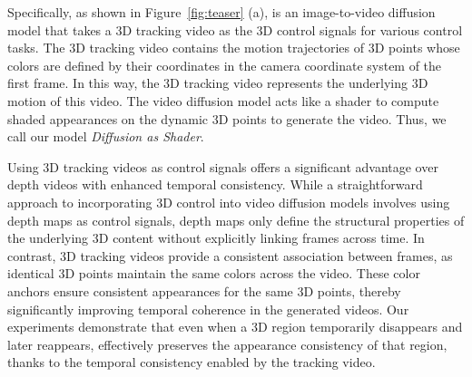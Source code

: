 Specifically, as shown in Figure~\ref{fig:teaser} (a), \methodname is an image-to-video diffusion model that takes a 3D tracking video as the 3D control signals for various control tasks. 
The 3D tracking video contains the motion trajectories of 3D points whose colors are defined by their coordinates in the camera coordinate system of the first frame. In this way, the 3D tracking video represents the underlying 3D motion of this video. The video diffusion model acts like a shader to compute shaded appearances on the dynamic 3D points to generate the video. Thus, we call our model \textit{Diffusion as Shader}.

Using 3D tracking videos as control signals offers a significant advantage over depth videos with enhanced temporal consistency. While a straightforward approach to incorporating 3D control into video diffusion models involves using depth maps as control signals, depth maps only define the structural properties of the underlying 3D content without explicitly linking frames across time. In contrast, 3D tracking videos provide a consistent association between frames, as identical 3D points maintain the same colors across the video. These color anchors ensure consistent appearances for the same 3D points, thereby significantly improving temporal coherence in the generated videos. Our experiments demonstrate that even when a 3D region temporarily disappears and later reappears, \methodname effectively preserves the appearance consistency of that region, thanks to the temporal consistency enabled by the tracking video.

